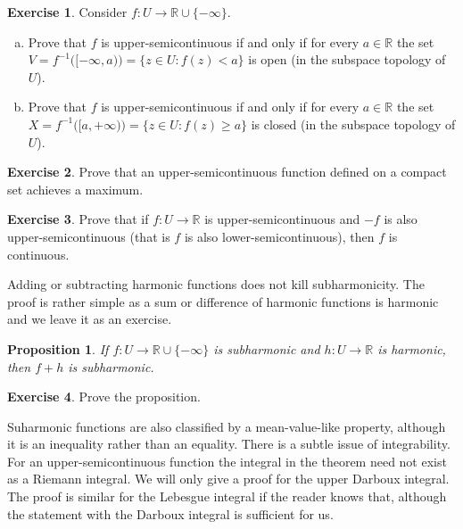 \documentclass[12pt,openany]{book}
\newcommand{\R}{{\mathbb{R}}}
\theoremstyle{plain}
\newtheorem{prop}[thm]{Proposition}
\theoremstyle{remark}
\theoremstyle{definition}
\newenvironment{exbox}{%
    \def\FrameCommand{\vrule width 1pt \relax\hspace{10pt}}%
    \MakeFramed{\advance\hsize-\width\FrameRestore}%
}{%
    \endMakeFramed
}
\newenvironment{exparts}{%
    \leavevmode\begin{enumerate}[a),noitemsep,topsep=0pt,parsep=0pt,partopsep=0pt]
}{%
    \end{enumerate}
}
\theoremstyle{exercise}
\newtheorem{exercise}{Exercise}[section]
\theoremstyle{example}
\begin{document}
\begin{exbox}
\begin{exercise}%
\label{exercise:uppersemicontclosedopen}
Consider $f \colon U \to \R \cup \{-\infty\}$.
\begin{exparts}
\item
Prove that $f$ is upper-semicontinuous if and only if
for every $a \in \R$
the set
$V = f^{-1}\bigl([-\infty,a)\bigr) = \bigl\{ z \in U : f(z) < a \bigr\}$
is open (in the subspace topology of $U$).
\item
Prove that $f$ is upper-semicontinuous if and only if
for every $a \in \R$
the set
$X = f^{-1}\bigl([a,+\infty)\bigr) = \bigl\{ z \in U : f(z) \geq a \bigr\}$
is closed (in the subspace topology of $U$).
\end{exparts}
\end{exercise}

\begin{exercise}%
\label{exercise:uppersemicontmax}
Prove that an upper-semicontinuous function defined on a compact set achieves a maximum.
\end{exercise}

\begin{exercise}
Prove that if $f \colon U \to \R$ is upper-semicontinuous and $-f$ is also
upper-semicontinuous (that is $f$ is also lower-semicontinuous), then $f$
is continuous.
\end{exercise}
\end{exbox}

Adding or subtracting 
harmonic functions does not kill subharmonicity.  The proof is rather simple
as a sum or difference of harmonic functions is harmonic and we leave it as
an exercise.

\begin{prop} \label{prop:fplushsubharmonic}
If $f \colon U \to \R \cup \{ - \infty \}$ is subharmonic and $h \colon U
\to \R$ is harmonic, then $f+h$ is subharmonic.
\end{prop}

\begin{exbox}
\begin{exercise}
Prove the proposition.
\end{exercise}
\end{exbox}

Suharmonic functions are also classified by a mean-value-like property,
although it is an inequality rather than an equality.  There is a subtle
issue of integrability.  For an upper-semicontinuous function
the integral in the theorem need not exist as a Riemann integral.
We will only give a proof for the upper Darboux integral.
The proof is 
similar for the Lebesgue integral if the reader knows that, although
the statement with the Darboux integral is sufficient for us.
\end{document}
